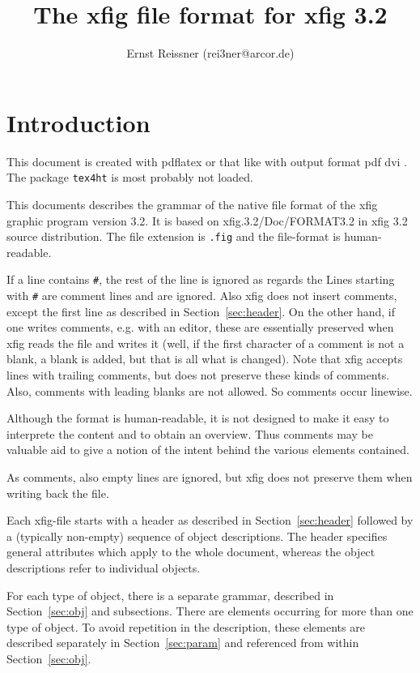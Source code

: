 \documentclass[10pt, a4paper]{article}
\title{The xfig file format for xfig 3.2 }
\author{Ernst Reissner (rei3ner@arcor.de)}
\newcommand{\aaa}{most probably not }
\newcommand{\aaa}{}
\newcommand{\aaa}{not }
\begin{document}
\maketitle
\tableofcontents

\section{Introduction}

This document is created with pdflatex or that like 
with output format 
\ifpdf
pdf%
\else
dvi%
\fi.
The package {\tt tex4ht} is \aaa loaded. 

This documents describes the grammar 
of the native file format of the xfig graphic program version 3.2. 
It is based on xfig.3.2/Doc/FORMAT3.2 in xfig 3.2 source distribution. 
The file extension is {\tt.fig} and the file-format is human-readable. 

If a line contains {\tt\#}, 
the rest of the line is ignored as regards the 
Lines starting with {\tt\#} are comment lines and are ignored. 
Also xfig does not insert comments, 
except the first line as described in Section~\ref{sec:header}. 
On the other hand, if one writes comments, e.g. with an editor, 
these are essentially preserved when xfig reads the file and writes it 
(well, if the first character of a comment is not a blank, 
a blank is added, but that is all what is changed). 
Note that xfig accepts lines with trailing comments, 
but does not preserve these kinds of comments. 
Also, comments with leading blanks are not allowed. 
So comments occur linewise. 

Although the format is human-readable, 
it is not designed to make it easy to interprete the content 
and to obtain an overview. 
Thus comments may be valuable aid to give a notion 
of the intent behind the various elements contained. 

As comments, also empty lines are ignored, 
but xfig does not preserve them when writing back the file. 

Each xfig-file starts with a header as described in Section~\ref{sec:header} 
followed by a (typically non-empty) sequence of object descriptions. 
The header specifies general attributes which apply to the whole document, 
whereas the object descriptions refer to individual objects. 

For each type of object, there is a separate grammar, 
described in Section~\ref{sec:obj} and subsections. 
There are elements occurring for more than one type of object. 
To avoid repetition in the description, 
these elements are described separately in Section~\ref{sec:param} 
and referenced from within Section~\ref{sec:obj}. 
\end{document}
